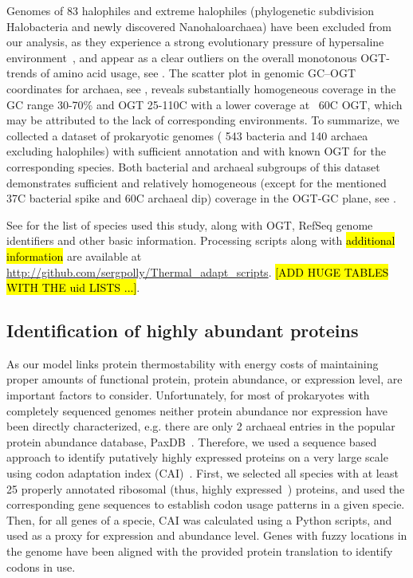 \documentclass[10pt,letterpaper]{article}
\begin{document}
Genomes of 83 halophiles and extreme halophiles (phylogenetic subdivision Halobacteria and newly discovered Nanohaloarchaea) have been excluded from our analysis, as they experience a strong evolutionary pressure of hypersaline environment~\cite{Fukuchi2003Unique}, and appear as a clear outliers on the overall monotonous OGT-trends of amino acid usage, see . The scatter plot in genomic GC--OGT coordinates for archaea, see , reveals substantially homogeneous coverage in the GC range 30-70\% and OGT 25-110\textdegree C with a lower coverage at ~60\textdegree C OGT, which may be attributed to the lack of corresponding environments. To summarize, we collected a dataset of prokaryotic genomes ( 543 bacteria and 140 archaea excluding halophiles) with sufficient annotation and with known OGT for the corresponding species. Both bacterial and archaeal subgroups of this dataset demonstrates sufficient and relatively homogeneous (except for the mentioned 37\textdegree C bacterial spike and 60\textdegree C archaeal dip) coverage in the OGT-GC plane, see .

See  for the list of species used this study, along with OGT, RefSeq genome identifiers and other basic information. Processing scripts along with \hl{additional information} are available at \url{http://github.com/sergpolly/Thermal_adapt_scripts}. \hl{[ADD HUGE TABLES WITH THE uid LISTS ...]}.



\subsection*{Identification of highly abundant proteins}
As our model links protein thermostability with energy costs of maintaining proper amounts of functional protein, protein abundance, or expression level, are important factors to consider. Unfortunately, for most of prokaryotes with completely sequenced genomes neither protein abundance nor expression have been directly characterized, e.g. there are only 2 archaeal entries in the popular protein abundance database, PaxDB~\cite{Wang2015Version}. Therefore, we used a sequence based approach to identify putatively highly expressed proteins on a very large scale using codon adaptation index (CAI)~\cite{Sharp1987The}.  First, we selected all species with at least 25 properly annotated ribosomal (thus, highly expressed~\cite{Pedersen1978Patterns,Srivastava1990Mechanism}) proteins, and used the corresponding gene sequences to establish codon usage patterns in a given specie. Then, for all genes of a specie, CAI was calculated using a Python scripts, and used as a proxy for expression and abundance level. Genes with fuzzy locations in the genome have been aligned with the provided protein translation to identify codons in use.
\end{document}
